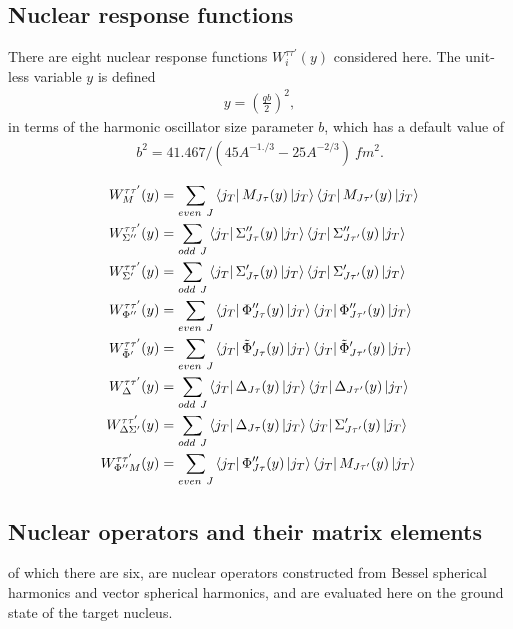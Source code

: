 \documentclass[11pt]{amsart}
\begin{document}
\subsection{Nuclear response functions}
There are eight nuclear response functions $W_i^{\tau\tau'}(y)$ considered here. The unit-less variable $y$ is defined 
\begin{align}
 y = \left ( \frac{qb}{2} \right) ^2,
 \end{align}
 in terms of the harmonic oscillator size parameter $b$, which has a default value of 
 \begin{align}
b^2 = 41.467/(45A^{-1./3} - 25A^{-2/3})\ fm^2.
 \end{align}

 
\begin{align}
W_M^{\tau\tau'}(y) &= \sum_{even\ J} 
\bra{j_T}M_{J\tau}(y)\ket{j_T}
\bra{j_T}M_{J\tau'}(y)\ket{j_T}
\\
W_{\Sigma''}^{\tau\tau'}(y) &= \sum_{odd\ J} 
\bra{j_T}{\Sigma''}_{J\tau}(y)\ket{j_T}
\bra{j_T}{\Sigma''}_{J\tau'}(y)\ket{j_T}
\\
W_{\Sigma'}^{\tau\tau'}(y) &= \sum_{odd\ J} 
\bra{j_T}{\Sigma'}_{J\tau}(y)\ket{j_T}
\bra{j_T}{\Sigma'}_{J\tau'}(y)\ket{j_T}
\\
W_{\Phi''}^{\tau\tau'}(y) &= \sum_{even\ J} 
\bra{j_T}{\Phi''}_{J\tau}(y)\ket{j_T}
\bra{j_T}{\Phi''}_{J\tau'}(y)\ket{j_T}
\\
W_{\tilde{\Phi}'}^{\tau\tau'}(y) &= \sum_{even\ J} 
\bra{j_T}{\tilde{\Phi}'}_{J\tau}(y)\ket{j_T}
\bra{j_T}{\tilde{\Phi}'}_{J\tau'}(y)\ket{j_T}
\\
W_{\Delta}^{\tau\tau'}(y) &= \sum_{odd\ J} 
\bra{j_T}{\Delta}_{J\tau}(y)\ket{j_T}
\bra{j_T}{\Delta}_{J\tau'}(y)\ket{j_T}
\\
W_{\Delta\Sigma'}^{\tau\tau'}(y) &= \sum_{odd\ J} 
\bra{j_T}{\Delta}_{J\tau}(y)\ket{j_T}
\bra{j_T}{\Sigma'}_{J\tau'}(y)\ket{j_T}
\\
W_{\Phi''M}^{\tau\tau'}(y) &= \sum_{even\ J} 
\bra{j_T}{\Phi''}_{J\tau}(y)\ket{j_T}
\bra{j_T}{M}_{J\tau'}(y)\ket{j_T}
\end{align}


\subsection{Nuclear operators and their matrix elements}
of which there are six, are nuclear operators constructed from Bessel spherical harmonics and vector spherical harmonics, and are evaluated here on the ground state of the target nucleus.
\end{document}
